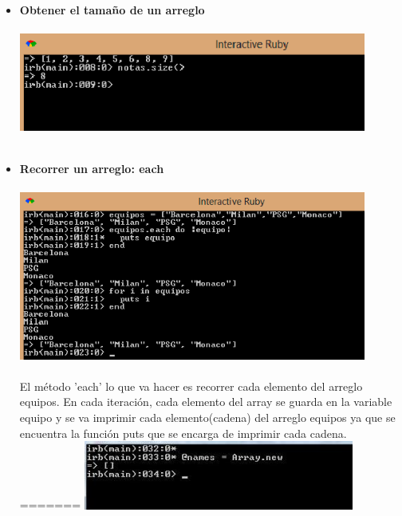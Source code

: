 \documentclass[11pt]{article} %
\begin{document}
\begin{itemize}
    \item  {\bf Obtener el tamaño de un arreglo}\\\\
        \includegraphics[width=0.9\textwidth]{./imagenes/SizeArreglo}\\\\

     \item  {\bf Recorrer un arreglo: each}\\\\
        \includegraphics[width=0.9\textwidth]{./imagenes/RecorrerArregloEach}\\\\
     El método 'each' lo que va hacer es recorrer cada elemento del arreglo equipos. En cada iteración, cada elemento del array se guarda en la variable equipo y se va imprimir cada elemento(cadena) del arreglo equipos ya que se encuentra la función puts que se encarga de imprimir cada cadena.\\
=======
    \includegraphics[width=0.7\textwidth]{./imagenes/new_array}\\



\end{itemize}
\end{document}
